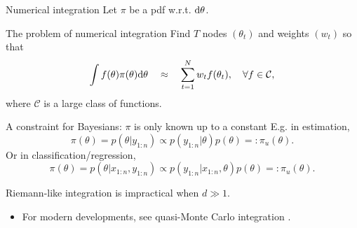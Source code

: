 \documentclass[10pt]{beamer}
\let\oldcite=\cite
\renewcommand\cite[1]{\hyperlink{#1}{\textcolor{vert}{\oldcite{#1}}}}
\let\oldcitep=\citep
\renewcommand\citep[1]{\hyperlink{#1}{\textcolor{vert}{\oldcitep{#1}}}}
\renewcommand\un[1]{\textcolor{magenta}{#1}}
\def\blank{\vspace{.5\textheight}}
\begin{document}
\begin{frame}{Numerical integration}
  Let $\pi$ be a pdf w.r.t. ${\rm d} \theta$.

  \begin{block}{The problem of numerical integration}
    Find $T$ nodes
    $(\theta_t)$ and weights $(w_t)$ so that
    $$
    \int f(\theta)\pi(\theta){\rm d} \theta \quad\approx\quad \sum_{t=1}^N w_t f(\theta_t), \quad \forall
    f\in\mathcal C,
    $$
    where $\mathcal C$ is a large class of functions.
  \end{block}
  \begin{alertblock}{A constraint for Bayesians: $\pi$ is only known up to a constant}
    E.g. in estimation,
    $$ \pi(\theta) = p(\theta\vert y_{1:n}) \propto p(y_{1:n}\vert\theta) p(\theta) =: \pi_u(\theta).$$
    Or in classification/regression,
    $$
    \pi(\theta) = p(\theta\vert x_{1:n}, y_{1:n}) \propto p(y_{1:n}\vert x_{1:n}, \theta) p(\theta)=: \pi_u(\theta).
    $$
  \end{alertblock}

  \end{frame}

\begin{frame}{Riemann-like integration is impractical when $d\gg 1$.}
\blank
\begin{itemize}
\item For modern developments, see quasi-Monte Carlo integration \citep{DiPi10}.
\end{itemize}
\end{frame}
\end{document}
